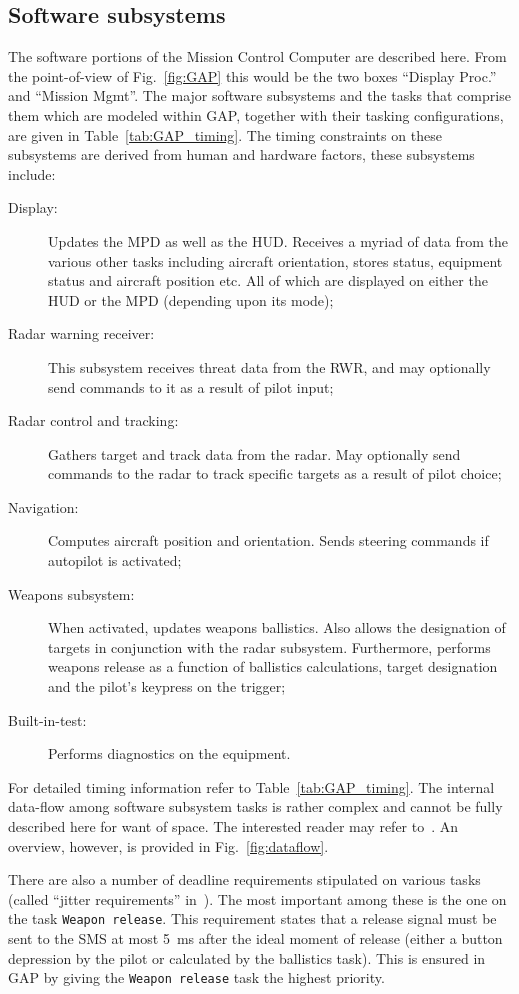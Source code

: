 \subsection{Software subsystems}
The software portions of the Mission Control Computer are described
here. From the point-of-view of Fig.~\ref{fig:GAP} this would be the
two boxes ``Display Proc.'' and ``Mission Mgmt''. The major software
subsystems and the tasks that comprise them which are modeled within
GAP, together with their tasking configurations, are given in
Table~\ref{tab:GAP_timing}. The timing constraints on these subsystems
are derived from human and hardware factors, these subsystems include:

\begin{description}
\item[Display:]{Updates the MPD as well as the HUD. Receives a myriad
  of data from the various other tasks including aircraft orientation,
  stores status, equipment status and aircraft position etc. All of
  which are displayed on either the HUD or the MPD (depending upon its
  mode);}
\item[Radar warning receiver:]{This subsystem receives threat data
  from the RWR, and may optionally send commands to it as a result of
  pilot input;}
\item[Radar control and tracking:]{Gathers target and track data from
  the radar. May optionally send commands to the radar to track
  specific targets as a result of pilot choice;}
\item[Navigation:]{Computes aircraft position and orientation. Sends
  steering commands if autopilot is activated;}
\item[Weapons subsystem:]{When activated, updates weapons
  ballistics. Also allows the designation of targets in conjunction
  with the radar subsystem. Furthermore, performs weapons release as a
  function of ballistics calculations, target designation and the
  pilot's keypress on the trigger;}
\item[Built-in-test:]{Performs diagnostics on the equipment.}
\end{description}

For detailed timing information refer to
Table~\ref{tab:GAP_timing}. The internal data-flow among software
subsystem tasks is rather complex and cannot be fully described here
for want of space. The interested reader may refer
to~\cite{locke@sei90}. An overview, however, is provided in
Fig.~\ref{fig:dataflow}.

There are also a number of deadline requirements stipulated on various
tasks (called ``jitter requirements'' in~\cite{locke@rtss91}). The
most important among these is the one on the task \texttt{Weapon
  release}. This requirement states that a release signal must be sent
to the SMS at most 5~ms after the ideal moment of release (either a
button depression by the pilot or calculated by the ballistics
task). This is ensured in GAP by giving the \texttt{Weapon release}
task the highest priority.

